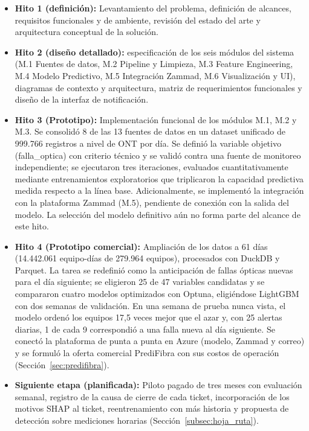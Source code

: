 \documentclass[12pt,a4paper]{article}
\begin{document}
\begin{itemize}
    \item \textbf{Hito 1 (definición):} Levantamiento del problema, definición de alcances, requisitos funcionales y de ambiente, revisión del estado del arte
    y arquitectura conceptual de la solución.
    \item \textbf{Hito 2 (diseño detallado):} especificación de los seis módulos del sistema (M.1 Fuentes de datos, M.2 Pipeline y Limpieza, M.3 Feature Engineering, M.4 Modelo Predictivo, M.5 Integración Zammad, M.6 Visualización y UI), diagramas de contexto y arquitectura,
    matriz de requerimientos funcionales y diseño de la interfaz de notificación.
    \item \textbf{Hito 3 (Prototipo):} Implementación funcional de los módulos M.1, M.2 y M.3. Se consolidó 8 de las 13 fuentes de datos en un dataset unificado de 999.766 registros a nivel de ONT por día. Se definió
    la variable objetivo (falla\_optica) con criterio técnico y se validó contra una fuente de monitoreo independiente; se ejecutaron tres iteraciones, evaluados cuantitativamente mediante entrenamientos exploratorios
    que triplicaron la capacidad predictiva medida respecto a la línea base. Adicionalmente, se implementó la integración con la plataforma Zammad (M.5), pendiente de conexión con la salida del modelo. La selección
    del modelo definitivo aún no forma parte del alcance de este hito.
    
    \item \textbf{Hito 4 (Prototipo comercial):} Ampliación de los datos a 61 días (14.442.061 equipo-días de 279.964 equipos), procesados con DuckDB y Parquet. La tarea se redefinió como la anticipación de fallas ópticas nuevas para el día siguiente; se eligieron 25 de 47 variables candidatas y se compararon cuatro modelos optimizados con Optuna, eligiéndose LightGBM con dos semanas de validación.
    En una semana de prueba nunca vista, el modelo ordenó los equipos 17,5 veces mejor que el azar y, con 25 alertas diarias, 1 de cada 9 correspondió a una falla nueva al día siguiente. Se conectó la plataforma de punta a punta en Azure (modelo, Zammad y correo) y se formuló la oferta comercial PrediFibra con sus costos de operación (Sección~\ref{sec:predifibra}).

    \item \textbf{Siguiente etapa (planificada):} Piloto pagado de tres meses con evaluación semanal, registro de la causa de cierre de cada ticket, incorporación de los motivos SHAP al ticket, reentrenamiento con más historia y propuesta de detección sobre mediciones horarias (Sección~\ref{subsec:hoja_ruta}).
\end{itemize}
\end{document}
